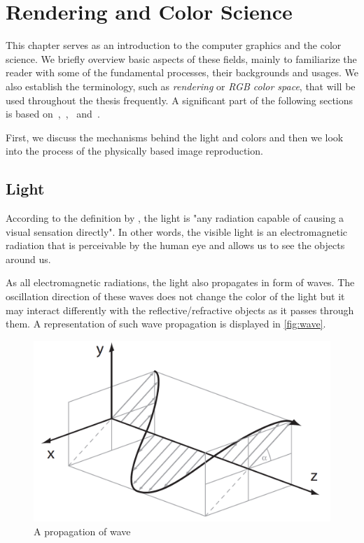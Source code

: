 \chapter{Rendering and Color Science}
\label{chap:render}

This chapter serves as an introduction to the computer graphics and the color science. We briefly overview basic aspects of these fields, mainly to familiarize the reader with some of the fundamental processes, their backgrounds and usages. We also establish the terminology, such as \emph{rendering} or \emph{RGB color space}, that will be used throughout the thesis frequently. A significant part of the following sections is based on~\citet{wyszecki1982color},~\citet{colorScienceSlides},~\citet{nimier2019mitsuba} and~\citet{pharr2016physically}.

First, we discuss the mechanisms behind the light and colors and then we look into the process of the physically based image reproduction.

\section{Light}

According to the definition by \citet{barbrow1964international}, the light is "any radiation capable of causing a visual sensation directly". In other words, the visible light is an electromagnetic radiation that is perceivable by the human eye and allows us to see the objects around us. 

As all electromagnetic radiations, the light also propagates in form of waves. The oscillation direction of these waves does not change the color of the light but it may interact differently with the reflective/refractive objects as it passes through them. A representation of such wave propagation is displayed in \autoref{fig:wave}.

\begin{figure}[h]
	\centering
	\includegraphics[width=0.7\linewidth]{img/wave.png}
	\caption{A propagation of wave~\cite{colorScienceSlides}}
	\label{fig:wave}
\end{figure}


